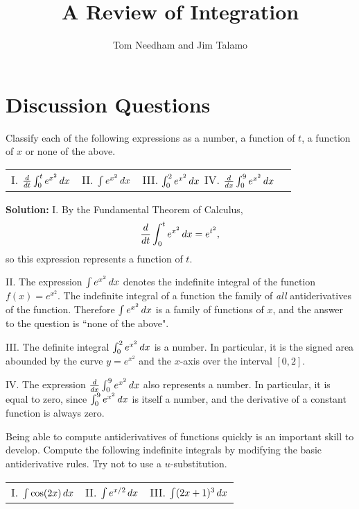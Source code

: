 \documentclass[handout,hints]{ximera}
\author{Tom Needham and Jim Talamo}
\title[]{A Review of Integration}
\begin{document}
\begin{abstract}
\end{abstract}
\maketitle

\vspace{-0.9in}

\section{Discussion Questions}

\begin{problem}
Classify each of the following expressions as a number, a function of $t$, a function of $x$ or none of the above.


\begin{tabular}{llll}
I. $\frac{\mathop{}\!d}{\mathop{}\!d t} \int_0^t e^{x^2} \mathop{}\!d x$ \hspace{0.2in} & II. $\int e^{x^2} \mathop{}\!d x$ \hspace{0.2in} & III. $\int_0^2 e^{x^2} \mathop{}\!d x$ \hspace{0.2in}
IV. $\frac{d}{dx} \int_0^9 e^{x^2} \mathop{}\!d x$
\end{tabular}

\end{problem}

\textbf{Solution:} I. By the Fundamental Theorem of Calculus, 
$$
\frac{\mathop{}\!d}{\mathop{}\!d t} \int_0^t e^{x^2} \mathop{}\!d x = e^{t^2},
$$
so this expression represents a function of $t$.

II. The expression $\int e^{x^2} \mathop{}\!d x$ denotes the indefinite integral of the function $f(x)=e^{x^2}$. The indefinite integral of a function the family of \textit{all} antiderivatives of the function. Therefore $\int e^{x^2} \mathop{}\!d x$ is a family of functions of $x$, and the answer to the question is ``none of the above".

III. The definite integral $\int_0^2 e^{x^2} \mathop{}\!d x$ is a number. In particular, it is the signed area abounded by the curve $y=e^{x^2}$ and the $x$-axis over the interval $[0,2]$. 

IV. The expression $\frac{d}{dx} \int_0^9 e^{x^2} \mathop{}\!d x$ also represents a number. In particular, it is equal to zero, since $\int_0^9 e^{x^2} \mathop{}\!d x$ is itself a number, and the derivative of a constant function is always zero.

\begin{problem}
Being able to compute antiderivatives of functions quickly is an important skill to develop.  Compute the following indefinite integrals by modifying the basic antiderivative rules.  Try not to use a $u$-substitution.

\begin{center}
\begin{tabular}{lll} 
I. $\int \cos(2x) \mathop{}\!d x$ \hspace{.7in} & II. $\int e^{x/2} \mathop{}\!d x$ \hspace{.7in} & III. $\int (2x+1)^3 \mathop{}\!d x$
\end{tabular}
\end{center}

\end{problem}
\end{document}
